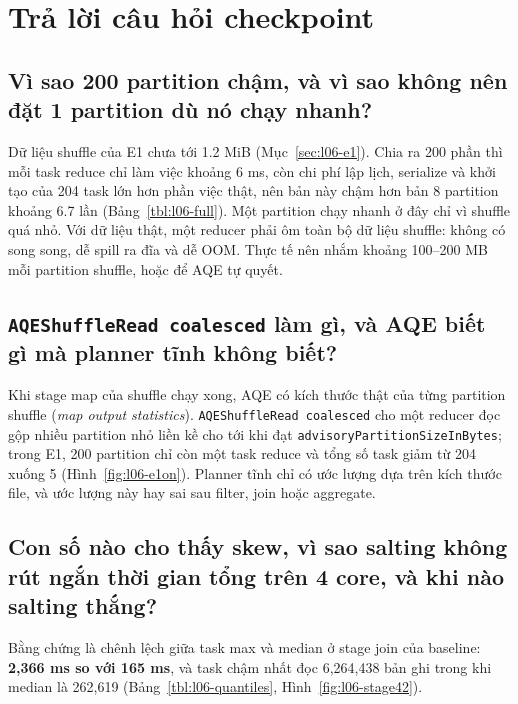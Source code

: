 \documentclass[
  12pt,
  a4paper,
]{report}
\begin{document}
\section{Trả lời câu hỏi checkpoint}\label{sec:l06-discussion}

\subsection{Vì sao 200 partition chậm, và vì sao không nên đặt 1
partition dù nó chạy nhanh?}\label{sec:l06-q1}

Dữ liệu shuffle của E1 chưa tới 1.2 MiB (Mục~\ref{sec:l06-e1}). Chia ra
200 phần thì mỗi task reduce chỉ làm việc khoảng 6 ms, còn chi phí lập
lịch, serialize và khởi tạo của 204 task lớn hơn phần việc thật, nên bản
này chậm hơn bản 8 partition khoảng 6.7 lần (Bảng~\ref{tbl:l06-full}).
Một partition chạy nhanh ở đây chỉ vì shuffle quá nhỏ. Với dữ liệu thật,
một reducer phải ôm toàn bộ dữ liệu shuffle: không có song song, dễ
spill ra đĩa và dễ OOM. Thực tế nên nhắm khoảng 100--200 MB mỗi
partition shuffle, hoặc để AQE tự quyết.

\subsection{\texorpdfstring{\texttt{AQEShuffleRead\ coalesced}\allowbreak{}
làm gì, và AQE biết gì mà planner tĩnh không
biết?}{AQEShuffleRead coalesced làm gì, và AQE biết gì mà planner tĩnh không biết?}}\label{sec:l06-q2}

Khi stage map của shuffle chạy xong, AQE có kích thước thật của từng
partition shuffle (\emph{map output statistics}).
\texttt{AQEShuffleRead\ coalesced}\allowbreak{} cho một reducer đọc gộp
nhiều partition nhỏ liền kề cho tới khi đạt
\texttt{advisoryPartitionSizeInBytes}\allowbreak{}; trong E1, 200
partition chỉ còn một task reduce và tổng số task giảm từ 204 xuống 5
(Hình~\ref{fig:l06-e1on}). Planner tĩnh chỉ có ước lượng dựa trên kích
thước file, và ước lượng này hay sai sau filter, join hoặc aggregate.

\subsection{Con số nào cho thấy skew, vì sao salting không rút ngắn thời
gian tổng trên 4 core, và khi nào salting thắng?}\label{sec:l06-q3}

Bằng chứng là chênh lệch giữa task max và median ở stage join của
baseline: \textbf{2,366 ms so với 165 ms}, và task chậm nhất đọc
6,264,438 bản ghi trong khi median là 262,619
(Bảng~\ref{tbl:l06-quantiles}, Hình~\ref{fig:l06-stage42}).
\end{document}
